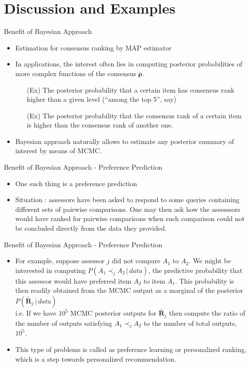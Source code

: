 \documentclass[11pt]{beamer}
\begin{document}
\section{Discussion and Examples}
\begin{frame}{Benefit of Bayesian Approach}
\begin{itemize}
    \item Estimation for consensus ranking by MAP estimator
    \item In applications, the interest often lies in computing posterior probabilities of more complex functions of the consensus $\boldsymbol{\rho}$.
    \begin{itemize}
        \item[(Ex)] The posterior probability that a certain item has consensus rank higher than a given level (“among the top 5”, say)
        \item[(Ex)] The posterior probability that the consensus rank of a certain item is higher than the consensus rank of another one. 
    \end{itemize}
    \item Bayesian approach naturally allows to estimate any posterior summary of interest by means of MCMC.
\end{itemize}
\end{frame}

\begin{frame}{Benefit of Bayesian Approach - Preference Prediction}
\begin{itemize}
    \item One such thing is a preference prediction
    \item Situation : assessors have been asked to respond to some queries containing different sets of pairwise comparisons. One may then ask how the assesssors would have ranked for pairwise comparisons when such comparison could not be concluded directly from the data they provided. 
    
\end{itemize}
\end{frame}

\begin{frame}{Benefit of Bayesian Approach - Preference Prediction}
\begin{itemize}
    \item For example, suppose assessor $j$ did not compare $A_1$ to $A_2$. We might be interested in computing $P(A_1\prec_j A_2 \,|\, data)$, the predictive probability that this assessor would have preferred item $A_2$ to item $A_1$. This probability is then readily obtained from the MCMC output as a marginal of the posterior $P(\tilde{\mathbf{R}_j}\,|\,data)$ \\ i.e. If we have $10^5$ MCMC posterior outputs for $\tilde{\mathbf{R}_j}$ then compute the ratio of the number of outputs satisfying $A_1\prec_j A_2$ to the number of total outputs, $10^5$. 
    \item This type of problems is called as preference learning or personalized ranking, which is a step towards personalized recommendation.
\end{itemize}
\end{frame}
\end{document}
